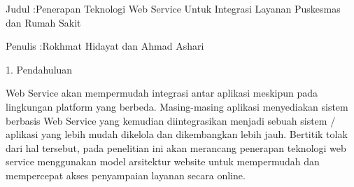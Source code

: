 \documentclass[12pt, times new roman, a4paper]{article}
\begin{document}
Judul	:Penerapan Teknologi Web Service Untuk Integrasi Layanan  Puskesmas dan Rumah Sakit


Penulis :Rokhmat Hidayat dan Ahmad Ashari

1. Pendahuluan

Web Service akan mempermudah integrasi antar aplikasi meskipun pada lingkungan platform yang berbeda. Masing-masing aplikasi menyediakan sistem berbasis Web Service yang kemudian diintegrasikan menjadi sebuah sistem / aplikasi yang lebih mudah dikelola dan dikembangkan lebih jauh. Bertitik tolak dari hal tersebut, pada penelitian ini akan merancang penerapan teknologi web service menggunakan model arsitektur website untuk mempermudah dan mempercepat akses penyampaian layanan secara online.
\end{document}
